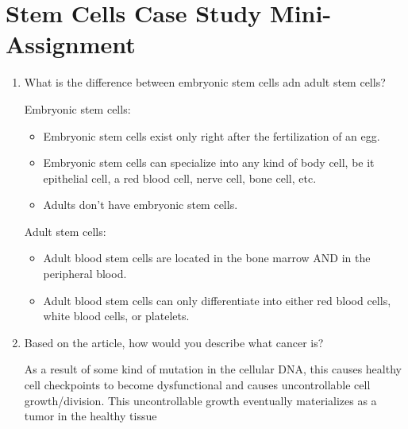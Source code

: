 \documentclass[12pt]{report}
\begin{document}
\section{Stem Cells Case Study Mini-Assignment}
\begin{enumerate}
\setlength\itemsep{0.5em}
    \item{What is the difference between embryonic stem cells adn adult stem cells?}
    \begin{solution}
        Embryonic stem cells:
        \begin{itemize}
            \item{Embryonic stem cells exist only right after the fertilization of an egg.}
            \item{Embryonic stem cells can specialize into any kind of body cell, be it epithelial cell, a red blood cell, nerve cell, bone cell, etc.}
            \item{Adults don't have embryonic stem cells.}
        \end{itemize}
        Adult stem cells:
        \begin{itemize}
            \item{Adult blood stem cells are located in the bone marrow AND in the peripheral blood.}
            \item{Adult blood stem cells can only differentiate into either red blood cells, white blood cells, or platelets.}
        \end{itemize}
    \end{solution}

    \item{Based on the article, how would you describe what cancer is?}
    \begin{solution}
            As a result of some kind of mutation in the cellular DNA, this causes healthy cell checkpoints to become dysfunctional and causes uncontrollable cell growth/division. This uncontrollable growth eventually materializes as a tumor in the healthy tissue
    \end{solution}


\end{enumerate}
\end{document}

